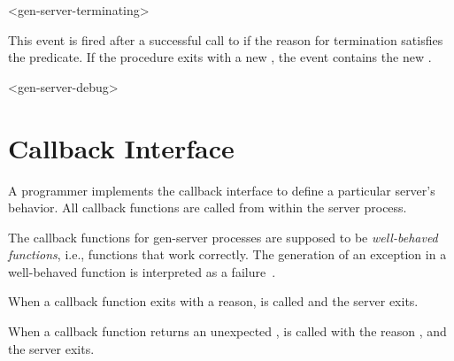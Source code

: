 \begin{pubevent}{<gen-server-terminating>}
\end{pubevent}

This event is fired after a successful call to 
if the reason for termination satisfies the 
predicate.
If the  procedure exits with a
new , the event contains the new .

\begin{pubevent}{<gen-server-debug>}
\end{pubevent}

\section {Callback Interface}

A programmer implements the callback interface to define a particular
server's behavior. All callback functions are called from within the
server process.

The callback functions for gen-server processes are supposed to be
\emph{well-behaved functions}, i.e., functions that work
correctly. The generation of an exception in a well-behaved function
is interpreted as a failure~\cite{armstrong-thesis}.

When a callback function exits with a reason,  is
called and the server exits.

When a callback function returns an unexpected ,
 is called with the reason
, and the server exits.


